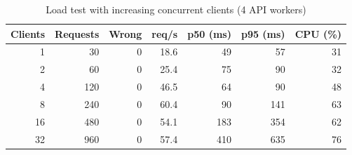 \begin{table}[H]
\centering
\caption{Load test with increasing concurrent clients (4 API workers)}
\label{tab:loadresults}
\small
\begin{tabular}{@{}rrrrrrr@{}}
\toprule
\textbf{Clients} & \textbf{Requests} & \textbf{Wrong} & \textbf{req/s} & \textbf{p50 (ms)} & \textbf{p95 (ms)} & \textbf{CPU (\%)}\\
\midrule
1 & 30 & 0 & 18.6 & 49 & 57 & 31\\
2 & 60 & 0 & 25.4 & 75 & 90 & 32\\
4 & 120 & 0 & 46.5 & 64 & 90 & 48\\
8 & 240 & 0 & 60.4 & 90 & 141 & 63\\
16 & 480 & 0 & 54.1 & 183 & 354 & 62\\
32 & 960 & 0 & 57.4 & 410 & 635 & 76\\
\bottomrule
\end{tabular}
\end{table}
